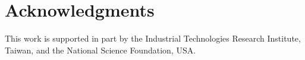 \section*{Acknowledgments}
This work is supported in part by the Industrial Technologies Research Institute, Taiwan, 
and the National Science Foundation, USA.
